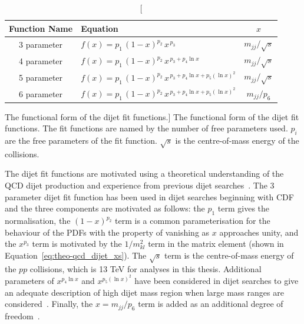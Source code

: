 {\renewcommand{\arraystretch}{1.3}
\begin{table}[!thb]
\centering
\begin{tabular}{|c||l|c|}
  \hline
  \textbf{Function Name} & \hspace{2cm} \textbf{Equation}                & \textbf{$x$} \\
  \hline
  3 parameter   & $f(x)=p_1\,(1-x)^{p_2}\,x^{\,p_3}$                       & $m_{jj}/\sqrt{s}$ \\
  4 parameter   & $f(x)=p_1\,(1-x)^{p_2}\,x^{\,p_3+p_4\ln{x}}$               & $m_{jj}/\sqrt{s}$\\
  5 parameter   & $f(x)=p_1\,(1-x)^{p_2}\,x^{\,p_3+p_4\ln{x}+p_5(\ln{x})^{2}}$  & $m_{jj}/\sqrt{s}$\\ 
  6 parameter   & $f(x)=p_1\,(1-x)^{p_2}\,x^{\,p_3+p_4\ln{x}+p_5(\ln{x})^{2}}$  &  $m_{jj}/p_6$\\ 
  \hline
\end{tabular}
\caption
    [The functional form of the dijet fit functions.]
    {The functional form of the dijet fit functions.
      The fit functions are named by the number of free parameters used. $p_{i}$ are the free parameters of the fit function.
      $\sqrt{s}$ is the centre-of-mass energy of the collisions.}
\label{tab:bkg-fit}
\end{table}}

The dijet fit functions are motivated using a theoretical understanding of the QCD dijet production
and experience from previous dijet searches~\cite{theo-dijet_harris}.
The 3 parameter dijet fit function has been used in dijet searches beginning with CDF~\cite{dijet-CDF_3par}
and the three components are motivated as follows:
the $p_1$ term gives the normalisation,
the $(1-x)^{p_2}$ term is a common parameterisation for the behaviour of the PDFs with the property of vanishing as $x$ approaches unity,
and the $x^{p_3}$ term is motivated by the $1/m_{kl}^2$ term in the matrix element (shown in Equation~\ref{eq:theo-qcd_dijet_xs}).
The $\sqrt{s}$ term is the centre-of-mass energy of the $pp$ collisions, which is 13 TeV for analyses in this thesis.
Additional parameters of $x^{p_4\ln{x}}$ and $x^{p_5(\ln{x})^{2}}$ have been considered in dijet searches to give an adequate description of
high dijet mass region when large mass ranges are considered~\cite{dijet-mori16_paper,dijet-CDF_4par}.
Finally, the $x=m_{jj}/p_6$ term is added as an additional degree of freedom~\cite{det-thesis_kate}.

